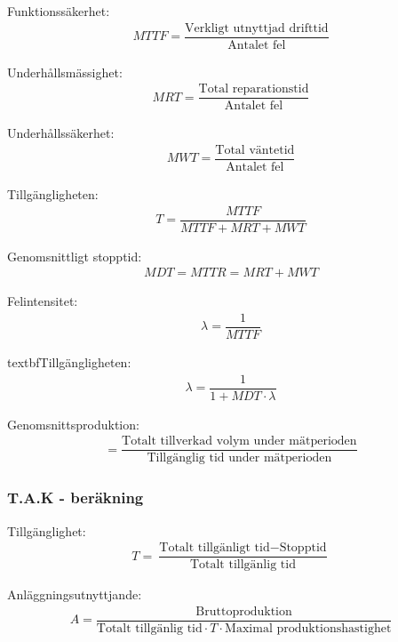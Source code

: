 			Funktionssäkerhet: 
      \begin{align*}
      MTTF = \dfrac{\text{Verkligt utnyttjad drifttid}}{\text{Antalet fel}} 
      \end{align*}
			
			Underhållsmässighet: 
      \begin{align*}
      MRT = \dfrac{\text{Total reparationstid}}{\text{Antalet fel}} 
      \end{align*}
			
			Underhållssäkerhet: 
      \begin{align*}
      MWT = \dfrac{\text{Total väntetid}}{\text{Antalet fel}} 
      \end{align*}
			
			Tillgängligheten: 
      \begin{align*}
      T = \dfrac{MTTF}{MTTF+MRT+MWT}
      \end{align*}

			Genomsnittligt stopptid: 
      \begin{align*}
      MDT = MTTR = MRT + MWT
      \end{align*}

			Felintensitet: 
      \begin{align*}
      \lambda = \dfrac{1}{MTTF} 
      \end{align*}

			textbf{Tillgängligheten: }
      \begin{align*}
      \lambda = \dfrac{1}{1+MDT\cdot\lambda} 
      \end{align*}
			
      Genomsnittsproduktion: 
      \begin{align*}
			 = \dfrac{\text{Totalt tillverkad volym under mätperioden}}{\text{Tillgänglig tid under mätperioden}} 
      \end{align*}
			
			\subsubsection*{T.A.K - beräkning}
			
      Tillgänglighet: 
      \begin{align*}
			T = \dfrac{\text{Totalt tillgänligt tid} - \text{Stopptid}}{\text{Totalt tillgänlig tid}}
      \end{align*}
			
      Anläggningsutnyttjande:  
      \begin{align*}
			A = \dfrac{\text{Bruttoproduktion}}{\text{Totalt tillgänlig tid}\cdot T \cdot \text{Maximal produktionshastighet}}
      \end{align*}
				
